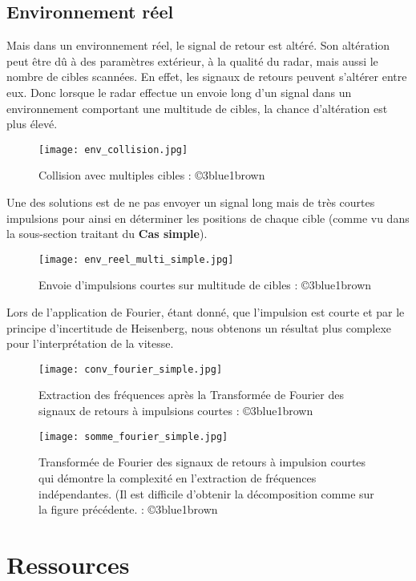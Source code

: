 \documentclass[a4paper]{book}
\begin{document}
\subsection{Environnement réel}
Mais dans un environnement réel, le signal de retour est altéré. Son altération
peut être dû à des paramètres extérieur, à la qualité du radar, mais aussi le
nombre de cibles scannées. En effet, les signaux de retours peuvent s'altérer
entre eux. Donc lorsque le radar effectue un envoie long d'un signal dans un
environnement comportant une multitude de cibles, la chance d'altération est 
plus élevé.
\begin{figure}[H]
	\centering
	\texttt{[image: env\_collision.jpg]}
	\caption{Collision avec multiples cibles
	: ©3blue1brown }
\end{figure}
Une des solutions est de ne pas envoyer un signal long mais de très courtes
impulsions pour ainsi en déterminer les positions de chaque cible (comme vu dans
la sous-section traitant du \textbf{Cas simple}).
\begin{figure}[H]
	\centering
	\texttt{[image: env\_reel\_multi\_simple.jpg]}
	\caption{Envoie d'impulsions courtes sur multitude de cibles
	: ©3blue1brown }
\end{figure}
Lors de l'application de Fourier, étant donné, que l'impulsion est courte et par
le principe d'incertitude de Heisenberg, nous obtenons un résultat plus complexe pour
l'interprétation de la vitesse.\hfill \break
\begin{figure}[H]
	\centering
	\texttt{[image: conv\_fourier\_simple.jpg]}
	\caption{Extraction des fréquences après la Transformée de Fourier des
	signaux de retours à impulsions courtes
	: ©3blue1brown }
\end{figure}
\begin{figure}[H]
	\centering
	\texttt{[image: somme\_fourier\_simple.jpg]}
	\caption{Transformée de Fourier des signaux de retours à impulsion
	courtes qui démontre la complexité en l'extraction de fréquences
	indépendantes. (Il est difficile d'obtenir la décomposition comme sur la
	figure précédente.
	: ©3blue1brown }
\end{figure}




\section{Ressources}
\end{document}
